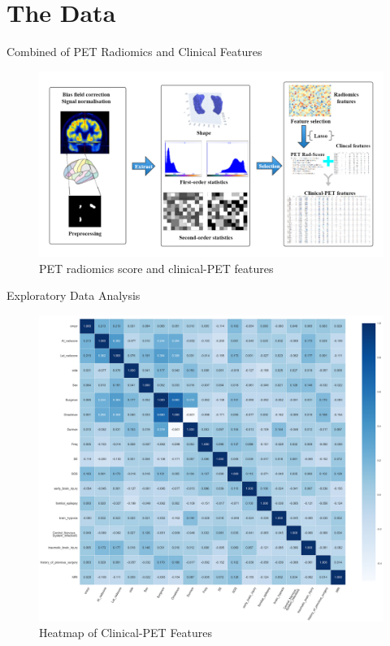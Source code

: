 \documentclass[
  11pt,
  ignorenonframetext,
  fontset=fandol]{beamer}
\begin{document}
\hypertarget{the-data}{%
\section{The Data}\label{the-data}}

\begin{frame}{Combined of PET Radiomics and Clinical Features}
\protect\hypertarget{combined-of-pet-radiomics-and-clinical-features}{}
\begin{figure}

{\centering \includegraphics[width=1.1\linewidth]{images/PET_radiomics} 

}

\caption{PET radiomics  score and clinical-PET features}\label{fig:unnamed-chunk-5}
\end{figure}
\end{frame}

\begin{frame}{Exploratory Data Analysis}
\protect\hypertarget{exploratory-data-analysis}{}
\begin{figure}

{\centering \includegraphics[width=0.6\linewidth]{images/heatplot} 

}

\caption{Heatmap of Clinical-PET Features}\label{fig:unnamed-chunk-6}
\end{figure}
\end{frame}
\end{document}
